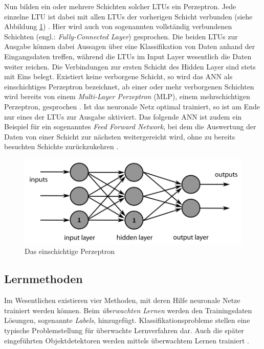 Nun bilden ein oder mehrere Schichten solcher LTUs ein Perzeptron. Jede einzelne LTU ist dabei mit allen LTUs der vorherigen Schicht verbunden (siehe Abbildung \ref{neural_network}) \cite{AurelienGeron.2018}. Hier wird auch von sogenannten vollständig verbundenen Schichten (engl.: \textit{Fully-Connected Layer}) gesprochen. Die beiden LTUs zur Ausgabe können dabei Aussagen über eine Klassifikation von Daten anhand der Eingangsdaten treffen, während die LTUs im Input Layer wesentlich die Daten weiter reichen. Die Verbindungen zur ersten Schicht des Hidden Layer sind stets mit Eins belegt. Existiert keine verborgene Schicht, so wird das ANN als einschichtiges Perzeptron bezeichnet, ab einer oder mehr verborgenen Schichten wird bereits von einem \textit{Multi-Layer Perzeptron} (MLP), einem mehrschichtigen Perzeptron, gesprochen \cite{AurelienGeron.2018}. Ist das neuronale Netz optimal trainiert, so ist am Ende nur eines der LTUs zur Ausgabe aktiviert. Das folgende ANN ist zudem ein Beispiel für ein sogenanntes \textit{Feed Forward Network}, bei dem die Auswertung der Daten von einer Schicht zur nächsten weitergereicht wird, ohne zu bereits besuchten Schichte zurückzukehren \cite{AurelienGeron.2018}.

\begin{figure}[ht]
	\begin{center}
		\includegraphics[width=12cm]{Bilder/neural_network.png} 
		\caption[Das einschichtige Perzeptron]{Das einschichtige Perzeptron \cite{Wikipedia.20190123}}
		\label{neural_network}
	\end{center}
\end{figure}

\subsection*{Lernmethoden}

Im Wesentlichen existieren vier Methoden, mit deren Hilfe neuronale Netze trainiert werden können. Beim \textit{überwachten Lernen} werden den Trainingsdaten Lösungen, sogenannte \textit{Labels}, hinzugefügt. Klassifikationsprobleme stellen eine typische Problemstellung für überwachte Lernverfahren dar. Auch die später eingeführten Objektdetektoren werden mittels überwachtem Lernen trainiert \cite{AurelienGeron.2018}. 

